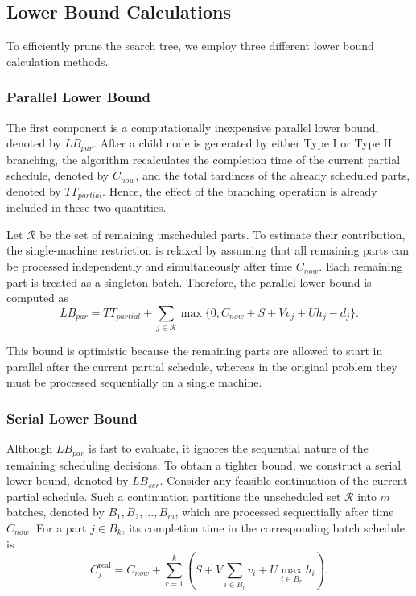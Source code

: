 \documentclass[letterpaper, 10 pt, conference]{ieeeconf}  %
\begin{document}
\subsection{Lower Bound Calculations}

To efficiently prune the search tree, we employ three different lower bound calculation methods.

\subsubsection{Parallel Lower Bound}

The first component is a computationally inexpensive parallel lower bound, denoted by $LB_{par}$. After a child node is generated by either Type I or Type II branching, the algorithm recalculates the completion time of the current partial schedule, denoted by $C_{now}$, and the total tardiness of the already scheduled parts, denoted by $TT_{partial}$. Hence, the effect of the branching operation is already included in these two quantities.

Let $\mathcal{R}$ be the set of remaining unscheduled parts. To estimate their contribution, the single-machine restriction is relaxed by assuming that all remaining parts can be processed independently and simultaneously after time $C_{now}$. Each remaining part is treated as a singleton batch. Therefore, the parallel lower bound is computed as
\begin{equation}
    LB_{par}
    =
    TT_{partial}
    +
    \sum_{j\in\mathcal{R}}
    \max\{0,C_{now}+S+Vv_j+Uh_j-d_j\}.
\end{equation}

This bound is optimistic because the remaining parts are allowed to start in parallel after the current partial schedule, whereas in the original problem they must be processed sequentially on a single machine.

\subsubsection{Serial Lower Bound}
Although $LB_{par}$ is fast to evaluate, it ignores the sequential nature of the remaining scheduling decisions. To obtain a tighter bound, we construct a serial lower bound, denoted by $LB_{ser}$. Consider any feasible continuation of the current partial schedule. Such a continuation partitions the unscheduled set $\mathcal{R}$ into $m$ batches, denoted by $B_1, B_2, \dots, B_m$, which are processed sequentially after time $C_{now}$. For a part $j \in B_k$, its completion time in the corresponding batch schedule is
\begin{equation}
    C_j^{\mathrm{real}}
    =
    C_{now}
    +
    \sum_{r=1}^{k}
    \left(
    S
    +
    V \sum_{i \in B_r} v_i
    +
    U \max_{i \in B_r} h_i
    \right).
\end{equation}
\end{document}
